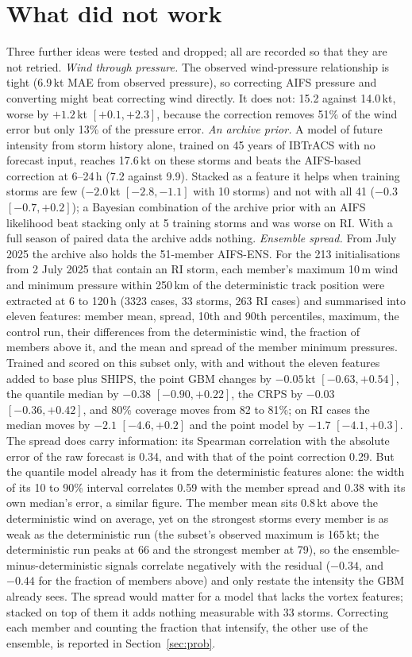 \documentclass[11pt]{article}
\begin{document}
\section{What did not work}\label{sec:dnw}

Three further ideas were tested and dropped; all are recorded so that they are not retried.
\emph{Wind through pressure.} The observed wind-pressure relationship is tight (6.9\,kt MAE from
observed pressure), so correcting AIFS pressure and converting might beat correcting wind
directly. It does not: 15.2 against 14.0\,kt, worse by $+1.2$\,kt $[+0.1, +2.3]$, because the
correction removes 51\% of the wind error but only 13\% of the pressure error. \emph{An archive
prior.} A model of future intensity from storm history alone, trained on 45 years of IBTrACS with
no forecast input, reaches 17.6\,kt on these storms and beats the AIFS-based correction at 6--24\,h
(7.2 against 9.9). Stacked as a feature it helps when training storms are few ($-2.0$\,kt
$[-2.8, -1.1]$ with 10 storms) and not with all 41 ($-0.3$ $[-0.7, +0.2]$); a Bayesian
combination of the archive prior with an AIFS likelihood beat stacking only at 5 training storms
and was worse on RI. With a full season of paired data the archive adds nothing.
\emph{Ensemble spread.} From July 2025 the archive also holds the 51-member AIFS-ENS. For the 213
initialisations from 2 July 2025 that contain an RI storm, each member's maximum 10\,m wind and
minimum pressure within 250\,km of the deterministic track position were extracted at 6 to
120\,h (3323 cases, 33 storms, 263 RI cases) and summarised into eleven features: member mean,
spread, 10th and 90th percentiles, maximum, the control run, their differences from the
deterministic wind, the fraction of members above it, and the mean and spread of the member
minimum pressures. Trained and scored on this subset only, with and without the eleven features
added to base plus SHIPS, the point GBM changes by $-0.05$\,kt $[-0.63, +0.54]$, the quantile
median by $-0.38$ $[-0.90, +0.22]$, the CRPS by $-0.03$ $[-0.36, +0.42]$, and 80\% coverage
moves from 82 to 81\%; on RI cases the median moves by $-2.1$ $[-4.6, +0.2]$ and the point model
by $-1.7$ $[-4.1, +0.3]$. The spread does carry information: its Spearman correlation with the
absolute error of the raw forecast is 0.34, and with that of the point correction 0.29. But the
quantile model already has it from the deterministic features alone: the width of its 10 to
90\% interval correlates 0.59 with the member spread and 0.38 with its own median's error, a
similar figure. The member mean sits 0.8\,kt above the deterministic wind on average, yet on the strongest
storms every member is as weak as the deterministic run (the subset's observed maximum is
165\,kt; the deterministic run peaks at 66 and the strongest member at 79), so the
ensemble-minus-deterministic signals correlate negatively with the residual ($-0.34$, and $-0.44$
for the fraction of members above) and only restate the intensity the GBM already sees. The
spread would matter for a model that lacks the vortex features; stacked on top of them it adds
nothing measurable with 33 storms. Correcting each member and counting the fraction that
intensify, the other use of the ensemble, is reported in Section~\ref{sec:prob}.
\end{document}
